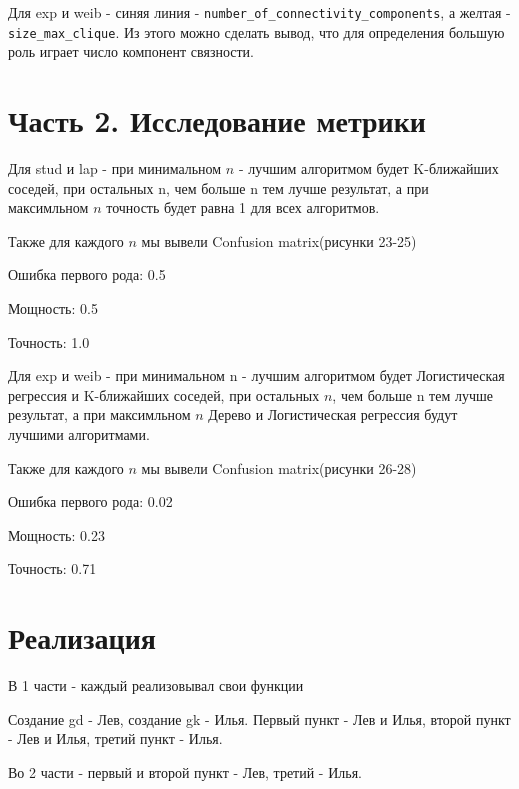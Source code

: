 \documentclass{HSEtitle}
\begin{document}
Для exp и weib - синяя линия - \texttt{number\_of\_connectivity\_components}, а желтая  - \texttt{size\_max\_clique}. Из этого можно сделать вывод, что для определения большую роль играет число компонент связности.

\section{Часть 2. Исследование метрики}

Для stud и lap - при минимальном $n$ - лучшим алгоритмом будет K-ближайших соседей, при остальных n, чем больше n тем лучше результат, а при максимльном $n$ точность будет равна 1 для всех алгоритмов.

Также для каждого $n$ мы вывели Confusion matrix(рисунки 23-25)

Ошибка первого рода:  0.5

Мощность:  0.5

Точность:  1.0

Для exp и weib - при минимальном n - лучшим алгоритмом будет Логистическая регрессия и K-ближайших соседей, при остальных $n$, чем больше n тем лучше результат, а при максимльном $n$ Дерево и Логистическая регрессия будут лучшими алгоритмами.

Также для каждого $n$ мы вывели Confusion matrix(рисунки 26-28)

Ошибка первого рода:  0.02

Мощность:  0.23

Точность:  0.71

\section{Реализация}

В 1 части - каждый реализовывал свои функции

Создание gd - Лев, создание gk - Илья. Первый пункт - Лев и Илья, второй пункт - Лев и Илья, третий пункт - Илья.

Во 2 части - первый и второй пункт - Лев, третий - Илья.
\end{document}
